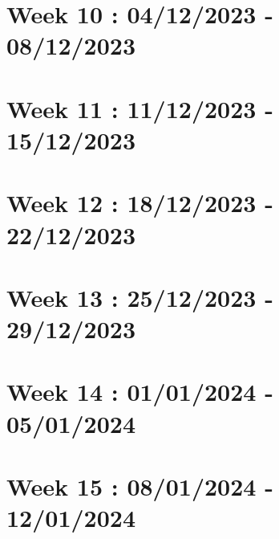 \documentclass[french]{article}
\begin{document}
	\section{Week 10 : 04/12/2023 - 08/12/2023}
	

	\section{Week 11 : 11/12/2023 - 15/12/2023}
	

	\section{Week 12 : 18/12/2023 - 22/12/2023}
	

	\section{Week 13 : 25/12/2023 - 29/12/2023}
	

	\section{Week 14 : 01/01/2024 - 05/01/2024}
	

	\section{Week 15 : 08/01/2024 - 12/01/2024}
	
\end{document}
